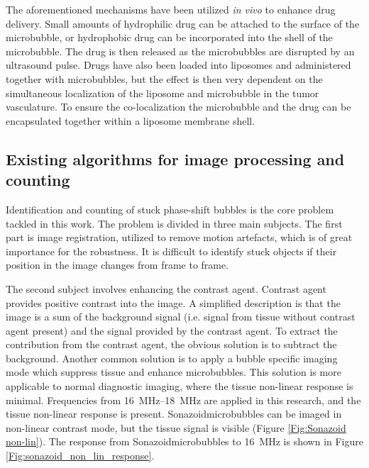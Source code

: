 The aforementioned mechanisms have been utilized \textit{in vivo} to enhance drug delivery. Small amounts of hydrophilic drug can be attached to the surface of the microbubble, or hydrophobic drug can be incorporated into the shell of the microbubble. The drug is then released as the microbubbles are disrupted by an ultrasound pulse\cite{Liu2006}. Drugs have also been loaded into liposomes and administered together with microbubbles, but the effect is then very dependent on the simultaneous localization of the liposome and microbubble in the tumor vasculature. To ensure the co-localization the microbubble and the drug can be encapsulated together within a liposome membrane shell\cite{Ibsen2011}.


  


\subsection{Existing algorithms for image processing and counting}
\label{existing algorithms}
Identification and counting of stuck phase-shift bubbles is the core problem tackled in this work. The problem is divided in three main subjects. The first part is image registration, utilized to remove motion artefacts, which is of great importance for the robustness. It is difficult to identify stuck objects if their position in the image changes from frame to frame.

The second subject involves enhancing the contrast agent. Contrast agent provides positive contrast into the image. A simplified description is that the image is a sum of the background signal (i.e. signal from tissue without contrast agent present) and the signal provided by the contrast agent. To extract the contribution from the contrast agent, the obvious solution is to subtract the background. Another common solution is to apply a bubble specific imaging mode which suppress tissue and enhance microbubbles. This solution is more applicable to normal diagnostic imaging, where the tissue non-linear response is minimal. Frequencies from \SIrange{16}{18}{\mega\hertz} are applied in this research, and the tissue non-linear response is present. Sonazoid\texttrademark microbubbles can be imaged in non-linear contrast mode, but the tissue signal is visible (Figure \ref{Fig:Sonazoid non-lin}). The response from Sonazoid\texttrademark microbubbles to \SI{16}{\mega\hertz} is shown in Figure \ref{Fig:sonazoid_non_lin_response}.

